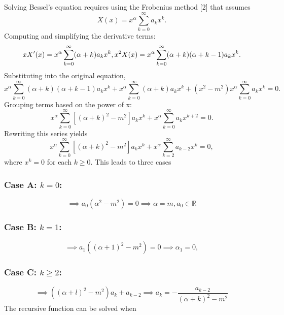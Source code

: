\documentclass{article}
\begin{document}
Solving Bessel's equation requires using the Frobenius method [2] that assumes
\begin{equation*}
X(x)=x^{\alpha} \sum_{k=0}^{\infty} a_k x^k.
\end{equation*}
Computing and simplifying the derivative terms:
\begin{equation*}
xX'(x)= x^{\alpha}\sum_{k=0}^{\infty} (\alpha+k)a_k x^k, \newline x^2X(x)=x^{\alpha}\sum_{k=0}^{\infty} (\alpha+k)(\alpha+k-1)a_k x^k.
\end{equation*}Substituting into the original equation,
\begin{equation*}
x^{\alpha}\sum_{k=0}^{\infty} (\alpha+k)(\alpha+k-1)a_k x^k + x^{\alpha}\sum_{k=0}^{\infty} (\alpha+k)a_k x^k +(x^2-m^2)x^{\alpha} \sum_{k=0}^{\infty} a_k x^k = 0.
\end{equation*}
Grouping terms based on the power of x:
\begin{equation*}
x^{\alpha}\sum_{k=0}^{\infty}[(\alpha+k)^2 -m^2]a_k x^k+ x^{\alpha} \sum_{k=0}^{\infty} a_{k} x^{k+2} = 0.
\end{equation*}
Rewriting this series yields
\begin{equation*}
x^{\alpha}\sum_{k=0}^{\infty}[(\alpha+k)^2 -m^2]a_k x^k+ x^{\alpha} \sum_{k=2}^{\infty} a_{k-2} x^{k} = 0,
\end{equation*}
where $x^k =0$ for each $ k \ge 0.$ This leads to three cases
\subsubsection{Case A: $k=0$:}
\begin{equation*}
\implies a_0(\alpha^2 -m^2) = 0 \implies \alpha = m, a_0 \in \mathbb{R}
\end{equation*}
\subsubsection{Case B: $k=1$:}
\begin{equation*}
\implies a_1((\alpha+1)^2 -m^2) = 0 \implies \alpha_1 = 0,
\end{equation*}
\subsubsection{Case C: $k \ge 2$:}
\begin{equation*}
\implies ((\alpha+l)^2 - m^2)a_k + a_{k-2} \implies a_k = -\frac{a_{k-2}}{(\alpha +k)^2 -m^2}
\end{equation*}
The recursive function can be solved when
\end{document}
